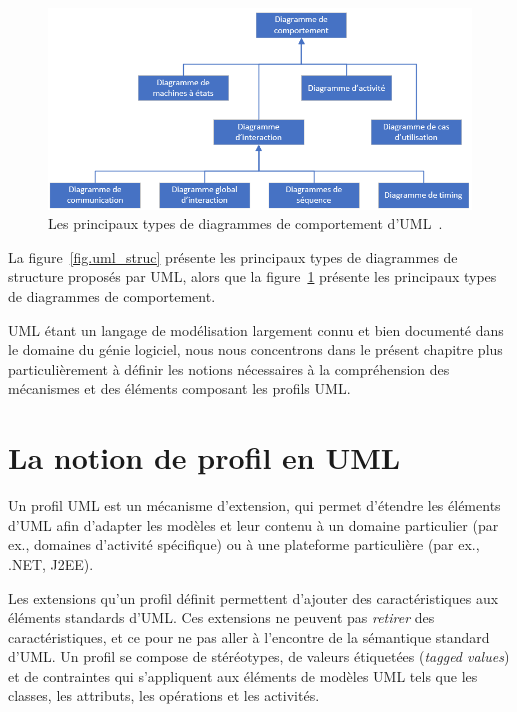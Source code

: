 \begin{figure}
    \centering
    \includegraphics[width=12cm]{10_img/chap4/comportement.PNG}
    \caption{Les principaux types de diagrammes de comportement d'UML~\cite{OMG_UML}.}
    \label{fig.uml_comp}
\end{figure}



La figure~\ref{fig.uml_struc} présente les principaux types de diagrammes de structure proposés par UML,
alors que la figure~\ref{fig.uml_comp} présente les principaux types de diagrammes de comportement.

UML \'etant un langage de modélisation largement connu et bien documenté dans le domaine du g\'enie logiciel,
nous nous concentrons dans le pr\'esent chapitre plus particulièrement à définir les notions nécessaires à la compréhension des mécanismes et des éléments composant les profils UML.



\section{La notion de profil en UML}



Un profil UML est un m\'ecanisme d'extension, qui
permet d'étendre les éléments d'UML afin d'adapter les mod\`eles et leur contenu à un domaine particulier (par ex.,  domaines d'activité spécifique) ou \`a une plateforme particulière (par ex.,  .NET, J2EE).

Les extensions qu'un profil d\'efinit permettent d'ajouter des caractéristiques aux éléments standards d'UML.
Ces extensions ne peuvent pas \emph{retirer} des caractéristiques, et ce pour ne pas aller à l'encontre de la sémantique standard d'UML.
Un profil se compose  de stéréotypes, de valeurs \'etiquet\'ees (\emph{tagged values}) et de contraintes qui s'appliquent aux éléments de modèles UML tels que les classes, les attributs, les opérations et les activités.

